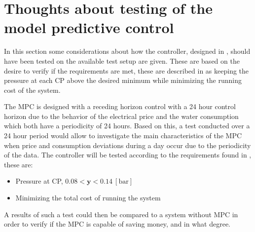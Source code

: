 \chapter{Thoughts about testing of the model predictive control}
\label{sec:MPT_test}

In this section some considerations about how the controller, designed in , should have been tested on the available test setup are given. These are based on the desire to verify if the requirements are met, these are described in  as keeping the pressure at each CP above the desired minimum while minimizing the running cost of the system.


The MPC is designed with a receding horizon control with a 24 hour control horizon due to the behavior of the electrical price and the water consumption which both have a periodicity of 24 hours. 
Based on this, a test conducted over a 24 hour period would allow to investigate the main characteristics of the MPC when price and consumption deviations during a day occur due to the periodicity of the data. The controller will be tested according to the requirements found in , these are: 
\begin{itemize}
	\item Pressure at CP, $0.08 < \bm{y} < 0.14 \:[\text{bar}]$
%
	\item Minimizing the total cost of running the system
\end{itemize}    

A results of such a test could then be compared to a system without MPC in order to verify if the MPC is capable of saving money, and in what degree.  



